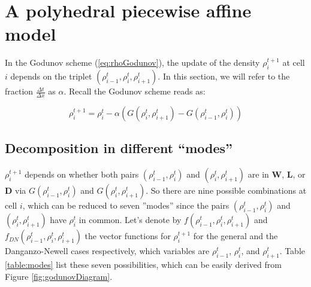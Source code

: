 \section{A polyhedral piecewise affine model}

In the Godunov scheme (\ref{eq:rhoGodunov}), the update of the density $\rho^{t+1}_{i}$ at cell $i$ depends on the triplet $(\rho^{t}_{i-1}, \rho^{t}_{i}, \rho^{t}_{i+1})$. In this section, we will refer to the fraction $\frac{\Delta t}{\Delta x}$ as $\alpha$. Recall the Godunov scheme reads as:

\begin{equation} \label{eq:rhoGodunov2}
\rho^{t+1}_{i} = \rho^{t}_{i} - \alpha\left(G(\rho^{t}_{i},\rho^{t}_{i+1})-G(\rho^{t}_{i-1},\rho^{t}_{i})\right)
\end{equation}

\subsection{Decomposition in different ``modes''}\label{sec:decompositionModes}

$\rho^{t+1}_{i}$ depends on whether both pairs $(\rho^{t}_{i-1}, \rho^{t}_{i})$ and $(\rho^{t}_{i}, \rho^{t}_{i+1})$ are in \textbf{W}, \textbf{L}, or \textbf{D} via $G(\rho^{t}_{i-1},\rho^{t}_{i})$ and $G(\rho^{t}_{i},\rho^{t}_{i+1})$. So there are nine possible combinations at cell $i$, which can be reduced to seven ''modes'' since the pairs $(\rho^{t}_{i-1}, \rho^{t}_{i})$ and $(\rho^{t}_{i}, \rho^{t}_{i+1})$ have $\rho^{t}_{i}$ in common. Let's denote by $f(\rho^{t}_{i-1},\rho^{t}_{i},\rho^{t}_{i+1})$ and $f_{DN}(\rho^{t}_{i-1},\rho^{t}_{i},\rho^{t}_{i+1})$ the vector functions for $\rho^{t+1}_{i}$ for the general and the Danganzo-Newell cases respectively, which variables are $\rho^{t}_{i-1}$, $\rho^{t}_{i}$, and $\rho^{t}_{i+1}$. Table \ref{table:modes} list these seven possibilities, which can be easily derived from Figure \ref{fig:godunovDiagram}.

